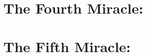 \documentclass[11pt]{book} %
\begin{document}

\chapter{The Fourth Miracle: }


\chapter{The Fifth Miracle: }
\end{document}
